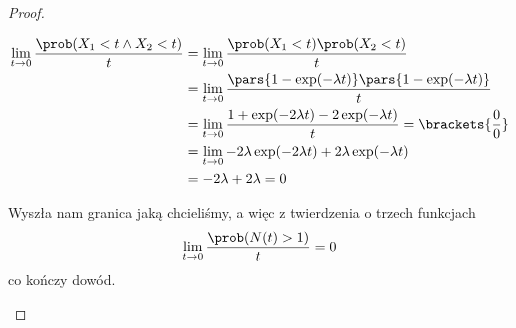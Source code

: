 \begin{proof}
\begin{enumerate}
		      \begin{align*}
			      \lim_{t \rightarrow 0} \frac{\prob(X_1 < t \land X_2 < t)}{t}
			       & = \lim_{t \rightarrow 0} \frac{\prob(X_1 < t)\prob(X_2 < t)}{t}                                       \\
			       & = \lim_{t \rightarrow 0} \frac{\pars{1 - \exp(-\lambda t)}\pars{1 - \exp(-\lambda t)}}{t}             \\
			       & = \lim_{t \rightarrow 0} \frac{1 + \exp(-2\lambda t) - 2\exp(-\lambda t)}{t} = \brackets{\frac{0}{0}} \\
			       & = \lim_{t \rightarrow 0} -2\lambda\exp(-2\lambda t) + 2\lambda\exp(-\lambda t)                        \\
			       & = -2\lambda + 2\lambda = 0
		      \end{align*}

		      Wyszła nam granica jaką chcieliśmy, a więc z twierdzenia o trzech funkcjach
		      \[
			      \lim_{t \rightarrow 0} \frac{\prob(N(t) > 1)}{t} = 0
		      \]
		      co kończy dowód.
	\end{enumerate}
\end{proof}